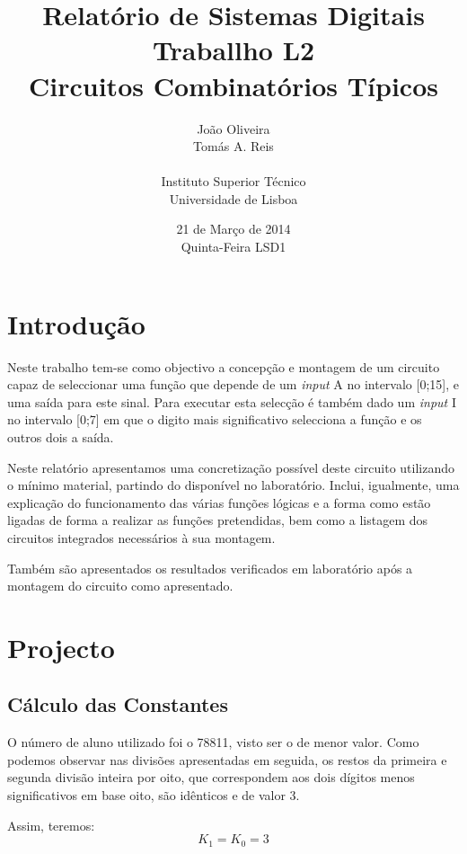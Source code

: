 \documentclass[a4paper,12pt]{article}
\begin{document}
\renewcommand{\sfdefault}{lmss}
\renewcommand{\familydefault}{\sfdefault}
\selectfont

\title{\bf Relatório de Sistemas Digitais \\
Traballho L2\\
Circuitos Combinatórios Típicos}
\author{João Oliveira\\
Tomás A. Reis\\
\\
Instituto Superior Técnico \\
Universidade de Lisboa}
\date{21 de Março de 2014 \\
Quinta-Feira LSD1}
\maketitle

\pagebreak
\section{Introdução}
Neste trabalho tem-se como objectivo a concepção e montagem de um circuito capaz de seleccionar uma função que depende de um {\it input} A no intervalo [0;15], e uma saída para este sinal. Para executar esta selecção é também dado um {\it input} I no intervalo [0;7] em que o digito mais significativo selecciona a função e os outros dois a saída. 
\par
Neste relatório apresentamos uma concretização possível deste circuito utilizando o mínimo material, partindo do disponível no laboratório. Inclui, igualmente, uma explicação do funcionamento das várias funções lógicas e a forma como estão ligadas de forma a realizar as funções pretendidas, bem como a listagem dos circuitos integrados necessários à sua montagem.
\par
Também são apresentados os resultados verificados em laboratório após a montagem do circuito como apresentado.

\section{Projecto}
\subsection{Cálculo das Constantes}
O número de aluno utilizado foi o 78811, visto ser o de menor valor. Como 
podemos observar nas divisões apresentadas em seguida, os restos da primeira e 
segunda divisão inteira por oito, que correspondem aos dois dígitos menos 
significativos em base oito, são idênticos e de valor 3. 
\par
\vspace*{1\baselineskip}
\hspace{20pt}  \hspace{60pt} 
\vspace*{1\baselineskip}
\par
Assim, teremos:
\begin{equation}
K_1=K_0=3
\end{equation}
\end{document}
